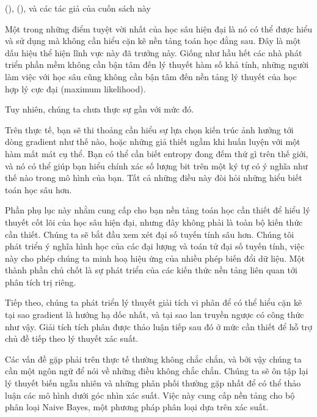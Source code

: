 \documentclass[letterpaper,11pt,english]{sphinxmanual}
\begin{document}
 (),  (), và các tác giả
của cuốn sách này



Một trong những điểm tuyệt vời nhất của học sâu hiện đại là nó có thể
được hiểu và sử dụng mà không cần hiểu cặn kẽ nền tảng toán học đằng
sau. Đây là một dấu hiệu thể hiện lĩnh vực này đã trưởng này. Giống như
hầu hết các nhà phát triển phần mềm không cần bận tâm đến lý thuyết hàm
số khả tính, những người làm việc với học sâu cũng không cần bận tâm đến
nền tảng lý thuyết của học hợp lý cực đại (maximum likelihood).



Tuy nhiên, chúng ta chưa thực sự gần với mức đó.



Trên thực tế, bạn sẽ thi thoảng cần hiểu sự lựa chọn kiến trúc ảnh hưởng
tới dòng gradient như thế nào, hoặc những giả thiết ngầm khi huấn luyện
với một hàm mất mát cụ thể. Bạn có thể cần biết entropy đong đếm thứ gì
trên thế giới, và nó có thể giúp bạn hiểu chính xác số lượng bit trên
một ký tự có ý nghĩa như thế nào trong mô hình của bạn. Tất cả những
điều này đòi hỏi những hiểu biết toán học sâu hơn.



Phần phụ lục này nhằm cung cấp cho bạn nền tảng toán học cần thiết để
hiểu lý thuyết cốt lõi của học sâu hiện đại, nhưng đây không phải là
toàn bộ kiến thức cần thiết. Chúng ta sẽ bắt đầu xem xét đại số tuyến
tính sâu hơn. Chúng tôi phát triển ý nghĩa hình học của các đại lượng và
toán tử đại số tuyến tính, việc này cho phép chúng ta minh hoạ hiệu ứng
của nhiều phép biến đổi dữ liệu. Một thành phần chủ chốt là sự phát
triển của các kiến thức nền tảng liên quan tới phân tích trị riêng.



Tiếp theo, chúng ta phát triển lý thuyết giải tích vi phân để có thể
hiểu cặn kẽ tại sao gradient là hướng hạ dốc nhất, và tại sao lan truyền
ngược có công thức như vậy. Giải tích tích phân được thảo luận tiếp sau
đó ở mức cần thiết để hỗ trợ chủ đề tiếp theo \textendash{} lý thuyết xác suất.



Các vấn đề gặp phải trên thực tế thường không chắc chắn, và bởi vậy
chúng ta cần một ngôn ngữ để nói về những điều không chắc chắn. Chúng ta
sẽ ôn tập lại lý thuyết biến ngẫu nhiên và những phân phối thường gặp
nhất để có thể thảo luận các mô hình dưới góc nhìn xác suất. Việc này
cung cấp nền tảng cho bộ phân loại Naive Bayes, một phương pháp phân
loại dựa trên xác suất.
\end{document}
